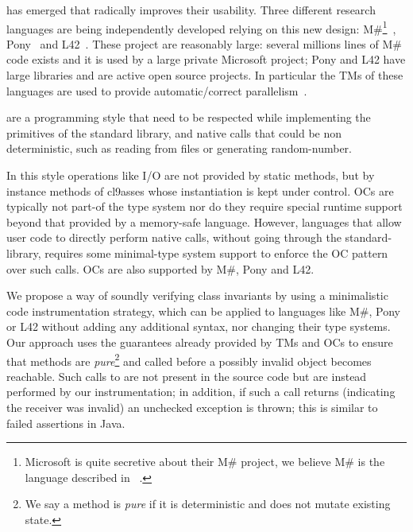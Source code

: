  has emerged that radically improves their usability.
Three different research languages are being independently developed relying on this new design: {M\#}\footnote{Microsoft is quite secretive about their M\# project, we believe M\# is the language described in ~\cite{?}.}~\cite{?}, Pony~\cite{?} and L42~\cite{?}.
These project are reasonably large: several millions lines of M\# code exists and it is used by a large private Microsoft project; Pony and L42 have large libraries and are active open source projects. In particular the TMs of these languages are used to provide automatic/correct parallelism~\cite{GordonEtAl12,clebsch2015deny,clebsch2017orca,?}.



 are a programming style that need to be respected while implementing the primitives of the standard library, and native calls that could be non deterministic, such as reading from files or generating random-number.

In this style operations like I/O are not provided by static methods, but by instance methods of cl9asses whose instantiation is kept under control.
OCs are typically not part-of the type system nor do they require special runtime support beyond that provided by a memory-safe language. However, languages that allow user code to directly perform native calls, without going through the standard-library, requires some minimal-type system support to enforce the OC pattern over such calls.
OCs are also supported by M\#, Pony and L42.




We propose a way of soundly verifying class invariants by using a minimalistic code instrumentation strategy, which can be applied to languages like M\#, Pony or  L42  without adding any additional syntax, nor changing their type systems. Our approach uses the guarantees already provided by TMs and OCs to ensure that \Q@invariant@ methods are \emph{pure}\footnote{We say a method is \emph{pure} if it is deterministic and does not mutate existing state.} and called before a possibly invalid object becomes reachable. Such calls to \Q@invariant@ are not present in the source code but are instead performed by our instrumentation; in addition, if such a call returns \Q@false@ (indicating the receiver was invalid) an unchecked exception is thrown; this is similar to failed assertions in Java.


